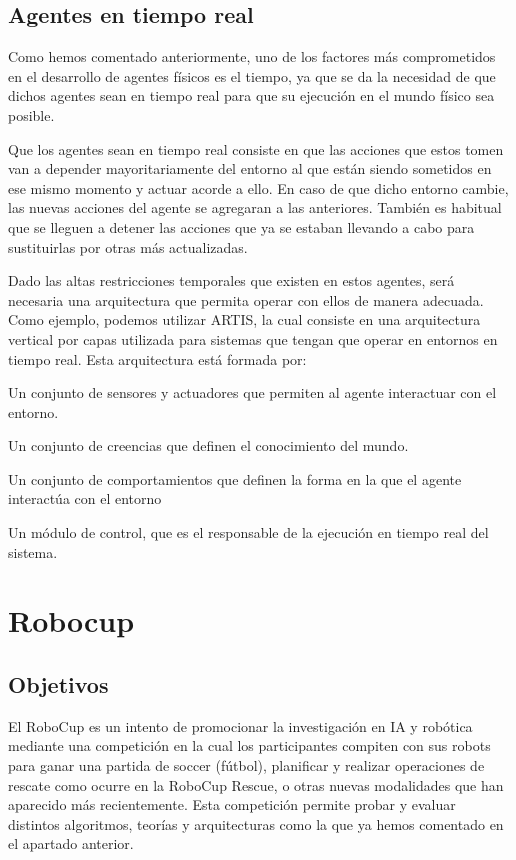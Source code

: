 \documentclass[11pt,oneside,a4paper]{book}
\begin{document}
\section{Agentes en tiempo real}
Como hemos comentado anteriormente, uno de los factores más comprometidos en el desarrollo de agentes físicos es el tiempo, ya que se da la necesidad de que dichos agentes sean en tiempo real para que su ejecución en el mundo físico sea posible.


Que los agentes sean en tiempo real consiste en que las acciones que estos tomen van a depender mayoritariamente del entorno al que están siendo sometidos en ese mismo momento y actuar acorde a ello. En caso de que dicho entorno cambie, las nuevas acciones del agente se agregaran a las anteriores. También es habitual que se lleguen a detener las acciones que ya se estaban llevando a cabo para sustituirlas por otras más actualizadas.

Dado las altas restricciones temporales que existen en estos agentes, será necesaria una arquitectura que permita operar con ellos de manera adecuada. Como ejemplo, podemos utilizar ARTIS, la cual consiste en una arquitectura vertical por capas utilizada para sistemas que tengan que operar en entornos en tiempo real. Esta arquitectura está formada por:


\begin{list}{•}{}
\item Un conjunto de sensores y actuadores  que permiten al agente interactuar con el entorno.	
\item Un conjunto de creencias que definen el conocimiento del mundo.
\item Un conjunto de comportamientos que definen la forma en la que el agente interactúa con el entorno 
\item Un módulo de control, que es el responsable de la ejecución en tiempo real del sistema. 
\end{list}


\chapter{Robocup}
\section{Objetivos}
El RoboCup es un intento de promocionar la investigación en IA y robótica mediante una competición en la cual los participantes compiten con sus robots para ganar una partida de soccer (fútbol), planificar y realizar operaciones de rescate como ocurre en la RoboCup Rescue, o otras nuevas modalidades que han aparecido más recientemente. Esta competición permite probar y evaluar distintos algoritmos, teorías y arquitecturas como la que ya hemos comentado en el apartado anterior.
\end{document}
